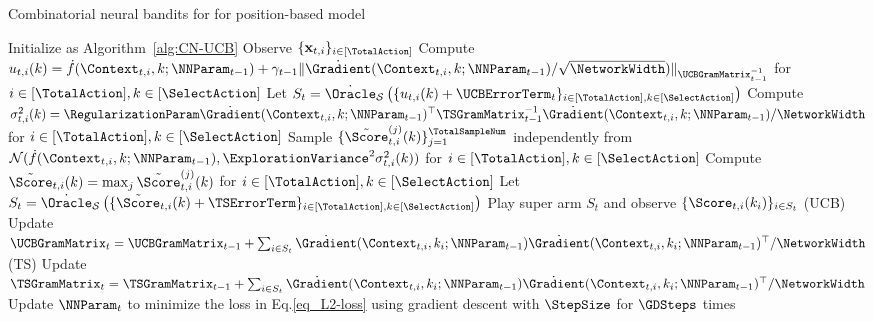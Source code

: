 \documentclass{article}
\theoremstyle{plain}
\begin{document}
\begin{algorithm*}[ht]
   \caption{Combinatorial neural bandits for for position-based model}
   \label{alg:CNB for position-based model}
\begin{algorithmic}
    \STATE Initialize as Algorithm~\ref{alg:CN-UCB}
    \STATE Observe $\{ \mathbf{x}_{t,i} \}_{i \in [\TotalAction]}$
        \STATE Compute $u_{t,i}(k) = \dot{f}(\Context_{t,i}, k; \NNParam_{t-1}) + \gamma_{t-1} \| \dot{\Gradient}(\Context_{t,i}, k; \NNParam_{t-1}) / \sqrt{\NetworkWidth}) \|_{\UCBGramMatrix_{t-1}^{-1}}$ for $i \in [\TotalAction], k \in [\SelectAction]$
        \STATE Let $S_t = \dot{\Oracle}_{\mathcal{S}} \left( \{u_{t,i}(k) + \UCBErrorTerm_t \}_{i \in [\TotalAction], k \in [\SelectAction]} \right)$
        \STATE Compute $ \sigma_{t,i}^2(k) = \RegularizationParam \dot{\Gradient}(\Context_{t,i}, k ; \NNParam_{t-1})^\top \TSGramMatrix_{t-1}^{-1} \dot{\Gradient}(\Context_{t,i}, k; \NNParam_{t-1}) / \NetworkWidth$ for $i \in [\TotalAction], k \in [\SelectAction]$
        \STATE Sample $\{ \tilde{\Score}_{t,i}^{(j)}(k) \}_{j=1}^{\TotalSampleNum}$ independently from $\mathcal{N}( \dot{f}(\Context_{t,i}, k; \NNParam_{t-1}), \ExplorationVariance^2 \sigma_{t,i}^2(k))$ for $i \in [\TotalAction], k \in [\SelectAction]$
        \STATE Compute $\tilde{\Score}_{t, i}(k)= \max_{j} \tilde{\Score}_{t,i}^{(j)}(k)$ for $i \in [\TotalAction], k \in [\SelectAction]$    
        \STATE Let $S_t = \dot{\Oracle}_{\mathcal{S}} \left( \{\tilde{\Score}_{t, i}(k) + \TSErrorTerm \}_{i \in [\TotalAction], k \in [\SelectAction]} \right)$
    \ENDIF
    \STATE Play super arm $S_t$ and observe $\{ \Score_{t, i}(k_i) \}_{i \in S_t}$
    \STATE (UCB) Update $\UCBGramMatrix_{t} = \UCBGramMatrix_{t-1} + \sum_{i \in S_t} \dot{\Gradient}(\Context_{t,i}, k_i; \NNParam_{t-1})  \dot{\Gradient}(\Context_{t,i}, k_i; \NNParam_{t-1})^\top / \NetworkWidth$
    \STATE (TS) Update $\TSGramMatrix_{t} = \TSGramMatrix_{t-1} + \sum_{i \in S_t} \dot{\Gradient}(\Context_{t,i}, k_i ; \NNParam_{t-1}) \dot{\Gradient} (\Context_{t,i}, k_i; \NNParam_{t-1})^\top /\NetworkWidth$
    \STATE Update $\NNParam_{t}$ to minimize the loss in Eq.\eqref{eq_L2-loss} using gradient descent with $\StepSize$ for $\GDSteps$ times
  \ENDFOR
\end{algorithmic}
\end{algorithm*}
\end{document}
